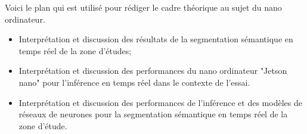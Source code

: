 ﻿{\color{red}
\par Voici le plan qui est utilisé pour rédiger le cadre théorique au sujet du nano ordinateur.
\begin{itemize}
   \item Interprétation et discussion des résultats de la segmentation sémantique en temps réel de la zone d’études;
   \item Interprétation et discussion des performances du nano ordinateur "Jetson nano" pour  l'inférence en temps réel dans le contexte de l'essai.
   \item Interprétation et discussion des performances de l'inférence et des modèles de réseaux de neurones pour la segmentation sémantique en temps réel de la zone d’étude.
\end{itemize}
}